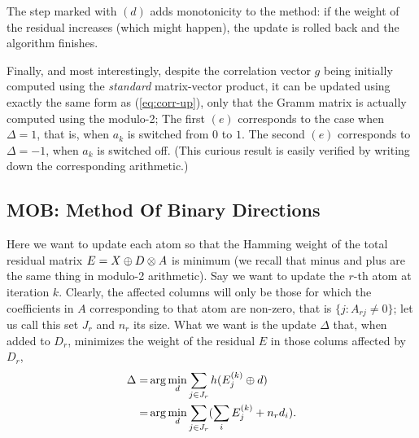 \documentclass[twocolumn]{IEEEtran}
\theoremstyle{definition}
\def\transp{^\intercal}
\newcommand{\refeq}[1]{(\ref{#1})}
\begin{document}
The step marked with $(d)$ adds monotonicity to the method: if the weight of the residual increases (which might happen), the update is rolled back and the algorithm finishes.

Finally, and most interestingly, despite the correlation vector $g$ being initially computed using the \emph{standard} matrix-vector product, it can be updated using exactly the same form as \refeq{eq:corr-up}, only that the Gramm matrix is actually computed using the modulo-2; The first $(e)$ corresponds to the case when $\Delta=1$, that is, when $a_k$ is switched from $0$ to $1$. The second $(e)$ corresponds to $\Delta=-1$, when $a_k$ is switched off. (This curious result is easily verified by writing down the corresponding arithmetic.) 

%
%
%  
\subsection{MOB: Method Of Binary Directions}
\label{sec:bdl:mod}
 
Here we want to update each atom so that the Hamming weight of the total residual matrix $E = X \oplus D \otimes A$ is minimum (we recall that minus and plus are the same thing in modulo-2 arithmetic). Say we want to update the $r$-th atom at iteration $k$. Clearly, the affected columns will only be those for which the  coefficients in $A$  corresponding to that atom are non-zero, that is $\{j : A_{rj} \neq 0 \}$; let us call this set $J_r$ and $n_r$ its size. What we want is the update $\Delta$ that, when added to $D_r$, minimizes the weight of the residual $E$ in those colums affected by $D_r$,
 \begin{eqnarray}
 \Delta  =& \arg\min_d \sum_{j \in J_r}  h(E\iter{k}_j \oplus d) \\
 =& \arg\min_d \sum_{j \in J_r} (\sum_i E\iter{k}_j + n_r d_i).
\label{eq:mob1}
 \end{eqnarray}
\end{document}
